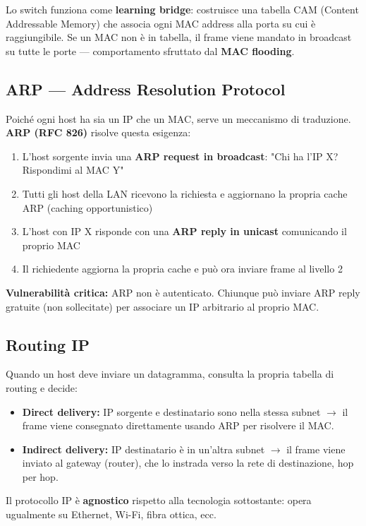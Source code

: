 \documentclass[12pt, a4paper]{report}
\begin{document}
Lo switch funziona come \textbf{learning bridge}: costruisce una tabella CAM (Content Addressable Memory) che associa ogni MAC address alla porta su cui è raggiungibile. Se un MAC non è in tabella, il frame viene mandato in broadcast su tutte le porte — comportamento sfruttato dal \textbf{MAC flooding}.

\subsection{ARP — Address Resolution Protocol}
Poiché ogni host ha sia un IP che un MAC, serve un meccanismo di traduzione. \textbf{ARP (RFC 826)} risolve questa esigenza:
\begin{enumerate}
	\item L'host sorgente invia una \textbf{ARP request in broadcast}: "Chi ha l'IP X? Rispondimi al MAC Y"
	\item Tutti gli host della LAN ricevono la richiesta e aggiornano la propria cache ARP (caching opportunistico)
	\item L'host con IP X risponde con una \textbf{ARP reply in unicast} comunicando il proprio MAC
	\item Il richiedente aggiorna la propria cache e può ora inviare frame al livello 2
\end{enumerate}

\textbf{Vulnerabilità critica:} ARP non è autenticato. Chiunque può inviare ARP reply gratuite (non sollecitate) per associare un IP arbitrario al proprio MAC.

\subsection{Routing IP}
Quando un host deve inviare un datagramma, consulta la propria tabella di routing e decide:
\begin{itemize}
	\item \textbf{Direct delivery:} IP sorgente e destinatario sono nella stessa subnet $\to$ il frame viene consegnato direttamente usando ARP per risolvere il MAC.
	\item \textbf{Indirect delivery:} IP destinatario è in un'altra subnet $\to$ il frame viene inviato al gateway (router), che lo instrada verso la rete di destinazione, hop per hop.
\end{itemize}

Il protocollo IP è \textbf{agnostico} rispetto alla tecnologia sottostante: opera ugualmente su Ethernet, Wi-Fi, fibra ottica, ecc.
\end{document}
